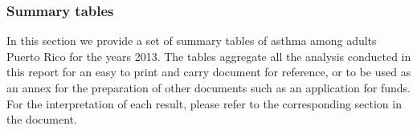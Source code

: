 \newpage
\subsubsection{Summary tables}
In this section we provide a set of summary tables of asthma among adults Puerto Rico for the years 2013. The tables aggregate all the analysis conducted in this report for an easy to print and carry document for reference, or to be used as an annex for the preparation of other documents such as an application for funds. For the interpretation of each result, please refer to the corresponding section in the document.


 
